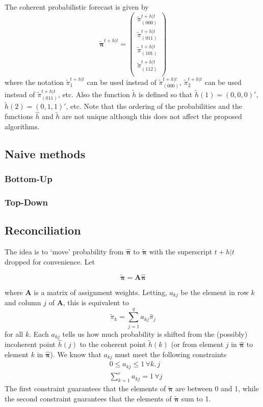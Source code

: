 \documentclass[a4paper,review,12pt,authoryear]{elsarticle}
\newcommand{\bpi}{\bm{\pi}}
\begin{document}
    The coherent probabilistic forecast is given by
    \[
    \tilde{\bpi}^{t+h|t}=\begin{pmatrix}
    \tilde{\pi}^{t+h|t}_{(000)}\\
    \tilde{\pi}^{t+h|t}_{(011)}\\
    \tilde{\pi}^{t+h|t}_{(101)}\\
    \tilde{\pi}^{t+h|t}_{(112)}\\
    \end{pmatrix}
    \]
    where the notation $\tilde{\pi}^{t+h|t}_{1}$ can be used instead of $\tilde{\pi}^{t+h|t}_{(000)}$, $\tilde{\pi}^{t+h|t}_{2}$ can be used instead of $\tilde{\pi}^{t+h|t}_{(011)}$, etc. Also the function $\tilde{h}$ is defined so that $\tilde{h}(1)=(0,0,0)'$, $\tilde{h}(2)=(0,1,1)'$, etc. Note that the ordering of the probabilities and the functions $\hat{h}$ and $\tilde{h}$ are not unique although this does not affect the proposed algorithms.
    
    \subsection{Naive methods}

    \subsubsection*{Bottom-Up}

    \subsubsection*{Top-Down}
    \subsection{Reconciliation}
    
    The idea is to `move' probability from $\hat{\bpi}$ to $\tilde{\bpi}$ with the superscript $t+h|t$ dropped for convenience.  Let
    
    \[
    \tilde{\bpi}=\bm{A}\hat{\bpi}
    \] 
    
    where $\bm{A}$ is a matrix of assignment weights. Letting, $a_{kj}$ be the element in row $k$ and column $j$ of $\bm{A}$, this is equivalent to
    \[
      \tilde{\pi}_k=\sum\limits_{j=1}^q a_{kj}\hat{{\pi}}_j
    \]
    for all $k$. Each $a_{kj}$ tells us how much probability is shifted from the (possibly) incoherent point $\hat{h}(j)$ to the coherent point $\tilde{h}(k)$ (or from element $j$ in $\hat{\bpi}$ to element $k$ in $\hat{\bpi}$). We know that $a_{kj}$ must meet the following constraints
    \begin{align*}
    &0\leq a_{kj} \leq 1 \,\forall k, j\\ 
    &\sum\limits_{k=1}^r a_{kj} = 1 \,\forall j 
    \end{align*}
    The first constraint guarantees that the elements of $\tilde{\bpi}$ are between 0 and 1, while the second constraint guarantees that the elements of $\tilde{\bpi}$ sum to 1.
    
\end{document}

